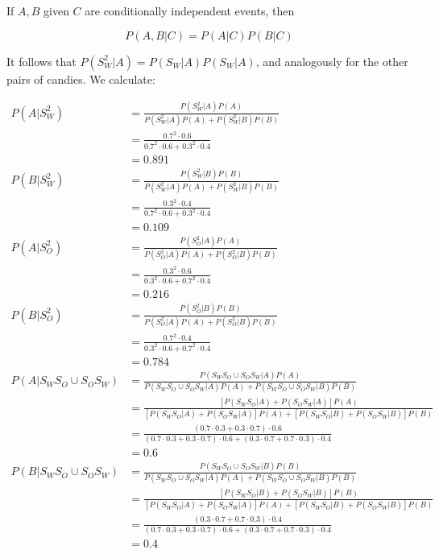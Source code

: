 \documentclass[10pt, oneside]{article}
\begin{document}
\begin{enumerate}[label=3.\arabic*]
\begin{defn} If $A, B$ given $C$ are conditionally independent events, then 

\[ P(A, B | C) = P(A | C) P(B | C) \]
\end{defn}

It follows that $P(S^2_W | A) = P(S_W | A) P(S_W | A)$, and analogously for the other pairs of candies. We calculate:

\begin{align*}
P(A | S^2_W) &= \frac{P(S^2_W | A) P(A) }{P(S^2_W | A) P(A) + P(S^2_W | B) P(B)} \\
&= \frac{0.7^2 \cdot 0.6 }{ 0.7^2 \cdot 0.6 + 0.3^2 \cdot 0.4} \\
&= \boxed{0.891} \\
P(B | S^2_W) &= \frac{P(S^2_W | B) P(B) }{P(S^2_W | A) P(A) + P(S^2_W | B) P(B)} \\
&= \frac{0.3^2 \cdot 0.4 }{ 0.7^2 \cdot 0.6 + 0.3^2 \cdot 0.4} \\
&= \boxed{0.109} \\
P(A | S^2_O) &= \frac{P(S^2_O | A) P(A) }{P(S^2_O | A) P(A) + P(S^2_O | B) P(B)} \\
&= \frac{0.3^2 \cdot 0.6 }{ 0.3^2 \cdot 0.6 + 0.7^2 \cdot 0.4} \\
&= \boxed{0.216} \\
P(B | S^2_O) &= \frac{P(S^2_O | B) P(B) }{P(S^2_O | A) P(A) + P(S^2_O | B) P(B)} \\
&= \frac{0.7^2 \cdot 0.4 }{ 0.3^2 \cdot 0.6 + 0.7^2 \cdot 0.4} \\
&= \boxed{0.784} \\
P(A | S_W S_O \cup S_O S_W) &= \frac{P(S_W S_O \cup S_O S_W | A) P(A)}{P(S_W S_O \cup S_O S_W | A) P(A) + P(S_W S_O \cup S_O S_W | B) P(B)} \\
&= \frac{ [ P(S_W S_O | A) + P(S_O S_W | A) ] P(A)}{ [ P(S_W S_O | A) + P(S_O S_W | A) ] P(A) + [ P(S_W S_O | B) + P(S_O S_W | B) ] P(B)} \\
&= \frac{ (0.7 \cdot 0.3 + 0.3 \cdot 0.7) \cdot 0.6}{ (0.7 \cdot 0.3 + 0.3 \cdot 0.7) \cdot 0.6 + (0.3 \cdot 0.7 + 0.7 \cdot 0.3) \cdot 0.4 } \\
&= \boxed{0.6} \\
P(B | S_W S_O \cup S_O S_W) &= \frac{P(S_W S_O \cup S_O S_W | B) P(B)}{P(S_W S_O \cup S_O S_W | A) P(A) + P(S_W S_O \cup S_O S_W | B) P(B)} \\
&= \frac{ [ P(S_W S_O | B) + P(S_O S_W | B) ] P(B)}{ [ P(S_W S_O | A) + P(S_O S_W | A) ] P(A) + [ P(S_W S_O | B) + P(S_O S_W | B) ] P(B)} \\
&= \frac{ (0.3 \cdot 0.7 + 0.7 \cdot 0.3) \cdot 0.4}{ (0.7 \cdot 0.3 + 0.3 \cdot 0.7) \cdot 0.6 + (0.3 \cdot 0.7 + 0.7 \cdot 0.3) \cdot 0.4 } \\
&= \boxed{0.4}
\end{align*}


\end{enumerate}
\end{document}
